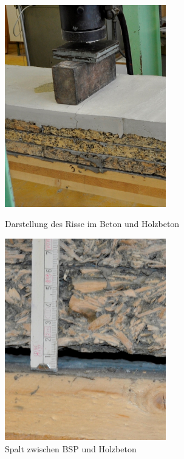 \begin{figure}[h!]
\begin{minipage}[hbt]{7cm}	
	\includegraphics[width=7cm]{Auswertung/3versuch/beton_veloxriss.jpg}
	\caption{Darstellung des Risse im Beton und Holzbeton}
	\label{beton_veloxriss}
\end{minipage}
\hfill
\begin{minipage}[hbt]{7cm}
	\includegraphics[width=7cm]{Auswertung/3versuch/fuge.jpg}
	\caption{Spalt zwischen BSP und Holzbeton}
	\label{spalt}
\end{minipage}
\end{figure}



